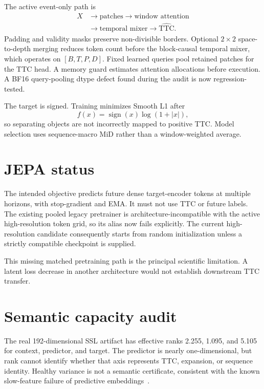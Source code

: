 \documentclass[10pt,twocolumn]{article}
\newcommand{\ttc}{\mathrm{TTC}}
\begin{document}
The active event-only path is
\begin{equation}
\begin{aligned}
X &\rightarrow \text{patches} \rightarrow \text{window attention}\\
  &\rightarrow \text{temporal mixer} \rightarrow \hat{\ttc}.
\end{aligned}
\end{equation}
Padding and validity masks preserve non-divisible borders. Optional $2\times2$
space-to-depth merging reduces token count before the block-causal temporal mixer,
which operates on $[B,T,P,D]$. Fixed learned queries pool retained patches for the
TTC head. A memory guard estimates attention allocations before execution. A BF16
query-pooling dtype defect found during the audit is now regression-tested.

The target is signed. Training minimizes Smooth L1 after
\begin{equation}
f(x)=\operatorname{sign}(x)\log(1+|x|),
\end{equation}
so separating objects are not incorrectly mapped to positive TTC. Model selection
uses sequence-macro MiD rather than a window-weighted average.

\section{JEPA status}

The intended objective predicts future dense target-encoder tokens at multiple
horizons, with stop-gradient and EMA. It must not use TTC or future labels. The
existing pooled legacy pretrainer is architecture-incompatible with the active
high-resolution token grid, so its alias now fails explicitly. The current
high-resolution candidate consequently starts from random initialization unless a
strictly compatible checkpoint is supplied.

This missing matched pretraining path is the principal scientific limitation. A
latent loss decrease in another architecture would not establish downstream TTC
transfer.

\section{Semantic capacity audit}

The real 192-dimensional SSL artifact has effective ranks 2.255, 1.095, and
5.105 for context, predictor, and target. The predictor is nearly one-dimensional,
but rank cannot identify whether that axis represents TTC, expansion, or sequence
identity. Healthy variance is not a semantic certificate, consistent with the
known slow-feature failure of predictive embeddings~\cite{slowfeatures2022}.
\end{document}

